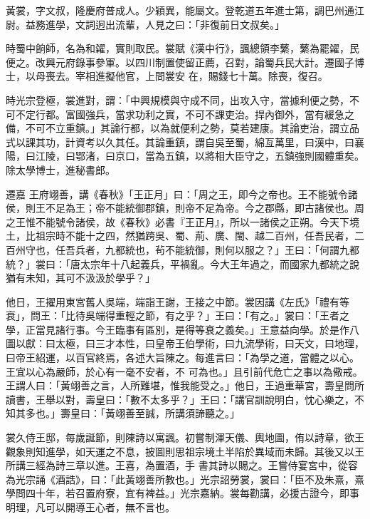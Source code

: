 \begin{pinyinscope}
 黃裳，字文叔，隆慶府普成人。少穎異，能屬文。登乾道五年進士第，調巴州通江尉。益務進學，文詞迥出流輩，人見之曰：「非復前日文叔矣。」



 時蜀中餉師，名為和糴，實則取民。裳賦《漢中行》，諷總領李蘩，蘩為罷糴，民便之。改興元府錄事參軍。以四川制置使留正薦，召對，論蜀兵民大計。遷國子博士，以母喪去。宰相進擬他官，上問裳安
 在，賜錢七十萬。除喪，復召。



 時光宗登極，裳進對，謂：「中興規模與守成不同，出攻入守，當據利便之勢，不可不定行都。富國強兵，當求功利之實，不可不課吏治。捍內御外，當有緩急之備，不可不立重鎮。」其論行都，以為就便利之勢，莫若建康。其論吏治，謂立品式以課其功，計資考以久其任。其論重鎮，謂自吳至蜀，綿亙萬里，曰漢中，曰襄陽，曰江陵，曰鄂渚，曰京口，當為五鎮，以將相大臣守之，五鎮強則國體重矣。除太學博士，進秘書郎。



 遷嘉
 王府翊善，講《春秋》「王正月」曰：「周之王，即今之帝也。王不能號令諸侯，則王不足為王；帝不能統御郡鎮，則帝不足為帝。今之郡縣，即古諸侯也。周之王惟不能號令諸侯，故《春秋》必書『王正月』，所以一諸侯之正朔。今天下境土，比祖宗時不能十之四，然猶跨吳、蜀、荊、廣、閩、越二百州，任吾民者，二百州守也，任吾兵者，九都統也，茍不能統御，則何以服之？」王曰：「何謂九都統？」裳曰：「唐太宗年十八起義兵，平禍亂。今大王年過之，而國家九都統之說
 猶有未知，其可不汲汲於學乎？」



 他日，王擢用東宮舊人吳端，端詣王謝，王接之中節。裳因講《左氏》「禮有等衰」，問王：「比待吳端得重輕之節，有之乎？」王曰：「有之。」裳曰：「王者之學，正當見諸行事。今王臨事有區別，是得等衰之義矣。」王意益向學。於是作八圖以獻：曰太極，曰三才本性，曰皇帝王伯學術，曰九流學術，曰天文，曰地理，曰帝王紹運，以百官終焉，各述大旨陳之。每進言曰：「為學之道，當體之以心。王宜以心為嚴師，於心有一毫不安者，不
 可為也。」且引前代危亡之事以為儆戒。王謂人曰：「黃翊善之言，人所難堪，惟我能受之。」他日，王過重華宮，壽皇問所讀書，王舉以對，壽皇曰：「數不太多乎？」王曰：「講官訓說明白，忱心樂之，不知其多也。」壽皇曰：「黃翊善至誠，所講須諦聽之。」



 裳久侍王邸，每歲誕節，則陳詩以寓諷。初嘗制渾天儀、輿地圖，侑以詩章，欲王觀象則知進學，如天運之不息，披圖則思祖宗境土半陷於異域而未歸。其後又以王所講三經為詩三章以進。王喜，為置酒，手
 書其詩以賜之。王嘗侍宴宮中，從容為光宗誦《酒誥》，曰：「此黃翊善所教也。」光宗詔勞裳，裳曰：「臣不及朱熹，熹學問四十年，若召置府寮，宜有裨益。」光宗嘉納。裳每勸講，必援古證今，即事明理，凡可以開導王心者，無不言也。




\end{pinyinscope}
